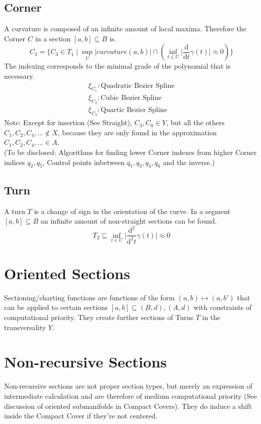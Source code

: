 \documentclass{report}
\begin{document}
\subsection{Corner}
A curvature is composed of an infinite amount of local maxima. Therefore the Corner $C$ in a section $[a,b] \subseteq B$ is.
\begin{equation}
C_{3} = \{C_{3} \in T_{1} \mid \sup_{U}\lvert curvature(a,b) \rvert \cap (\inf_{t \in U} \lvert \frac{\mathrm{d}}{\mathrm{d}t}\gamma(t) \rvert \approx 0) \}
\end{equation}
The indexing corresponds to the minimal grade of the polynomial that is necessary.
\begin{align}
\xi_{C_{1}} : \text{Quadratic Bezier Spline}\\
\xi_{C_{2}} : \text{Cubic Bezier Spline}\\
\xi_{C_{3}} : \text{Quartic Bezier Spline}
\end{align}
Note: Except for insertion (See Straight), $C_{3},C_{0} \in Y$, but all the others $C_{1},C_{2},C_{4},... \not\in X$, because they are only found in the approximation $C_{1},C_{2},C_{4},... \in A$.\\
(To be disclosed: Algorithms for finding lower Corner indexes from higher Corner indices $q_{2},q_{5}$, Control points inbetween $q_{1},q_{3},q_{4},q_{6}$ and the inverse.)

\subsection{Turn}
A turn $T$ is a change of sign in the orientation of the curve. In a segment $[a,b] \subseteq B$ an infinite amount of non-straight sections can be found.
\begin{equation}
T_{2} \subseteq \inf_{t \in U} \lvert \frac{\mathrm{d}^2}{\mathrm{d}^2t}\gamma(t) \rvert \approx 0
\end{equation}

\section*{Oriented Sections}
Sectioning/charting functions are functions of the form $(a,b) \mapsto (a,b')$ that can be applied to certain sections $[a,b] \subseteq (B,d),(A,d)$ with constraints of computational priority. They create further sections of Turns $T$ in the transversality $Y$.

\section{Non-recursive Sections}
Non-recursive sections are not proper section types, but merely an expression of intermediate calculation and are therefore of medium computational priority (See discussion of oriented submanifolds in Compact Covers). They do induce a shift inside the Compact Cover if they're not centered.\\\\
\end{document}

